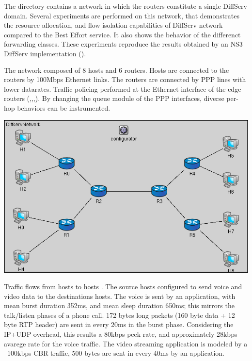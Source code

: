 The  directory contains
a network in which the routers constitute a single DiffServ domain.
Several experiments are performed on this network, that demonstrates
the resource allocation, and flow isolation capabilities of DiffServ
network compared to the Best Effort service. It also shows the
behavior of the differenct forwarding classes. These experiments
reproduce the results obtained by an NS3 DiffServ implementation
(\cite{Sanjay2010}).

The network composed of 8 hosts and 6 routers.
Hosts are connected to the routers by 100Mbps Ethernet links. The
routers are connected by PPP lines with lower datarates.
Traffic policing performed at the Ethernet interface of the edge
routers (,,,). By changing
the queue module of the PPP interfaces, diverse per-hop behaviors
can be instrumented.

\begin{center}
\includegraphics[scale=0.5]{figures/OneDomainDiffservNetwork.png}
\end{center}

Traffic flows from hosts  to hosts . The source hosts
configured to send voice and video data to the destinations hosts. The voice
is sent by an  application, with mean burst duration
352ms, and mean sleep duration 650ms; this mirrors the talk/listen phases
of a phone call. 172 bytes long packets (160 byte data + 12 byte RTP header)
are sent in every 20ms in the burst phase. Considering the IP+UDP overhead,
this results a 80kbps peek rate, and approximately 28kbps avarege rate for
the voice traffic. The video streaming application is modeled by a ~100kbps
CBR traffic, 500 bytes are sent in every 40ms by an 
application.

